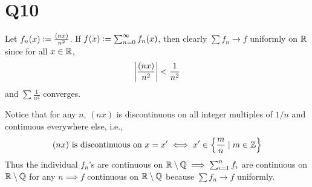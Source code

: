 \documentclass[12pt]{article}
\begin{document}
\section*{Q10}
Let $f_n(x) \vcentcolon= \frac{(nx)}{n^2}$. 
If $f(x) \vcentcolon= \sum_{n = 0}^{\infty} f_{n}(x)$, then clearly $\sum f_n \rightarrow f$ uniformly on $\mathbb{R}$ since for all $x \in \mathbb{R}$, 
$$\left|\frac{(nx)}{n^2}\right| < \frac{1}{n^2}$$  
and $\sum \frac{1}{n^2}$ converges. 

Notice that for any $n$, $(nx)$ is discontinuous on all integer multiples of $1 / n$ and continuous everywhere else, i.e.,  
\begin{equation} \label{eq:q10discnt}
  (nx) \text{ is discontinuous on } x = x' \iff x' \in \left\{\frac{m}{n} \mid m \in \mathbb{Z}\right\}
\end{equation}
Thus the individual $f_n$'s are continuous on $\mathbb{R} \setminus \mathbb{Q} \implies \sum_{i = 1}^{n} f_i$ are continuous on $\mathbb{R} \setminus \mathbb{Q}$ for any $n \implies f$ continuous on $\mathbb{R} \setminus \mathbb{Q}$ because $\sum f_n \rightarrow f$ uniformly.  
\end{document}
